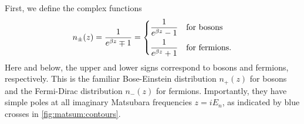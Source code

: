 First, we define the complex functions
\begin{equation}
	n_\pm(z) = \frac{1}{e^{\beta z} \mp 1}
	         = \begin{dcases}
		           \displaystyle \frac{1}{e^{\beta z} - 1} & \text{for bosons}     \\
		           \displaystyle \frac{1}{e^{\beta z} + 1} & \text{for fermions} . \\
	           \end{dcases}
\label{eq:matsum:distribution}
\end{equation}
Here and below, the upper and lower signs correspond to bosons and fermions, respectively.
This is the familiar Bose-Einstein distribution $n_+(z)$ for bosons and the Fermi-Dirac distribution $n_-(z)$ for fermions.
Importantly, they have simple poles at all imaginary Matsubara frequencies $z = i E_n$, as indicated by blue crosses in \cref{fig:matsum:contours}.


\def\r{1.65}
\def\w{0.21} %
\def\n{16}
\iffalse
\def\drawpoles{
	\path[blue, decoration={markings, mark=between positions 0.01 and 1 step 3mm with {\cross}}, postaction={decorate}] (0, -\r+\w/2) -- (0, +\r-\w/2) node [black, right=0.15cm, yshift=-0.5cm] {\scriptsize $i E_n$};
	\path[blue, decoration={markings, mark=between positions 0 and 1 step 1.0 with {\cross}}, postaction={decorate}] (-\r/2, 0) node[black, above] {\scriptsize $-E$} -- (+\r/2, 0) node [black, above] {\scriptsize $+E$};
}
\fi
\def\N{9}
\def\drawpoles{
\foreach \n in {1,2,...,\N} {
	\def\y{-\r + (\n-1)/(\N-1)*(2*\r)}
	\node[draw,cross] at (0,{\y}) {};
}
\node[label={[label distance=3pt]right:{\scriptsize $iE_n$}}] at (0,\r/2) {};
\node[draw,cross,label=above:{\scriptsize $+E$}] at (+\r/2,0) {};
\node[draw,cross,label=above:{\scriptsize $-E$}] at (-\r/2,0) {};
}
\def\drawaxes{
	\draw[->, black!50!white, thin] (-1.38*\r, 0) -- (+1.38*\r, 0.0) node [above, black] {\scriptsize $\text{Re}(z)$};
	\draw[->, black!50!white, thin] (0, -1.38*\r) -- (0, +1.38*\r) node [right, black] {\scriptsize $\text{Im}(z)$};
}
\def\cross{
	\draw (-2pt,-2pt) -- (+2pt,+2pt);
	\draw (+2pt,-2pt) -- (-2pt,+2pt);
}

